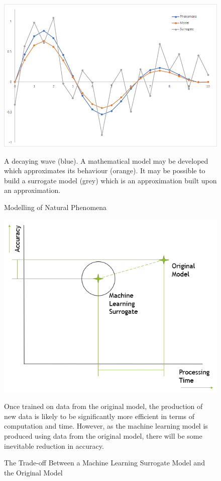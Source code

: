 \begin{figure}[p]
	\centering
	\includegraphics[scale=0.65]{Figures/surrogate_model.png}
	\caption{Modelling of Natural Phenomena} {A decaying wave (blue). A mathematical model may be developed which approximates its behaviour (orange). It may be possible to build a surrogate model (grey) which is an approximation built upon an approximation.}
	\label{fig:surrogate}
\end{figure}

\begin{figure}[h]
	\centering
	\includegraphics[scale=0.65]{Figures/MLS_vs_OM.png}
	\caption{The Trade-off Between a Machine Learning Surrogate Model and the Original Model} {Once trained on data from the original model, the production of new data is likely to be significantly more efficient in terms of computation and time. However, as the machine learning model is produced using data from the original model, there will be some inevitable reduction in accuracy.}
	\label{fig:surrogate_vs_model}
\end{figure}

